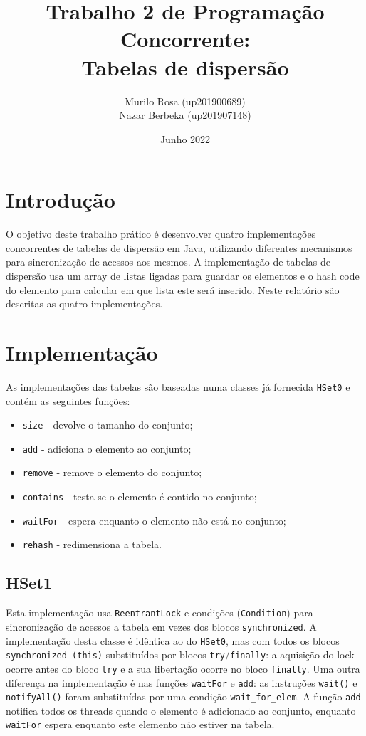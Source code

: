 \documentclass{report}
\title{Trabalho 2 de Programação Concorrente:\\Tabelas de dispersão}
\author{Murilo Rosa (up201900689)\\Nazar Berbeka (up201907148)}
\date{Junho 2022}
\begin{document}
\maketitle
\tableofcontents

\newpage

\chapter{Introdução}
O objetivo deste trabalho prático é desenvolver quatro implementações concorrentes de tabelas de dispersão em Java, utilizando diferentes mecanismos para sincronização de acessos aos mesmos. A implementação de tabelas de dispersão usa um array de listas ligadas para guardar os elementos e o hash code do elemento para calcular em que lista este será inserido. Neste relatório são descritas as quatro implementações.

\chapter{Implementação}
As implementações das tabelas são baseadas numa classes já fornecida \texttt{HSet0} e contém as seguintes funções:

\begin{itemize}
\item \texttt{size} - devolve o tamanho do conjunto;
\item \texttt{add} - adiciona o elemento ao conjunto;
\item \texttt{remove} - remove o elemento do conjunto;
\item \texttt{contains} - testa se o elemento é contido no conjunto;
\item \texttt{waitFor} - espera enquanto o elemento não está no conjunto;
\item \texttt{rehash} - redimensiona a tabela.
\end{itemize}

\section{HSet1}
Esta implementação usa \texttt{ReentrantLock} e condições (\texttt{Condition}) para sincronização de acessos a tabela em vezes dos blocos \texttt{synchronized}. A implementação desta classe é idêntica ao do \texttt{HSet0}, mas com todos os blocos \texttt{synchronized (this)} substituídos por blocos \texttt{try}/\texttt{finally}: a aquisição do lock ocorre antes do bloco \texttt{try} e a sua libertação ocorre no bloco \texttt{finally}. Uma outra diferença na implementação é nas funções \texttt{waitFor} e \texttt{add}: as instruções \texttt{wait()} e \texttt{notifyAll()} foram substituídas por uma condição \texttt{wait\_for\_elem}. A função \texttt{add} notifica todos os threads quando o elemento é adicionado ao conjunto, enquanto \texttt{waitFor} espera enquanto este elemento não estiver na tabela.
\end{document}
